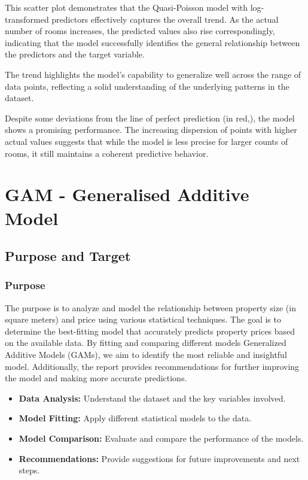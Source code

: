 \documentclass[
]{article}
\begin{document}
This scatter plot demonstrates that the Quasi-Poisson model with
log-transformed predictors effectively captures the overall trend. As
the actual number of rooms increases, the predicted values also rise
correspondingly, indicating that the model successfully identifies the
general relationship between the predictors and the target variable.

The trend highlights the model's capability to generalize well across
the range of data points, reflecting a solid understanding of the
underlying patterns in the dataset.

Despite some deviations from the line of perfect prediction (in red,),
the model shows a promising performance. The increasing dispersion of
points with higher actual values suggests that while the model is less
precise for larger counts of rooms, it still maintains a coherent
predictive behavior.

\section{GAM - Generalised Additive
Model}\label{gam---generalised-additive-model}

\subsection{Purpose and Target}\label{purpose-and-target-3}

\subsubsection{Purpose}\label{purpose}

The purpose is to analyze and model the relationship between property
size (in square meters) and price using various statistical techniques.
The goal is to determine the best-fitting model that accurately predicts
property prices based on the available data. By fitting and comparing
different models Generalized Additive Models (GAMs), we aim to identify
the most reliable and insightful model. Additionally, the report
provides recommendations for further improving the model and making more
accurate predictions.

\begin{itemize}
\item
  \textbf{Data Analysis:} Understand the dataset and the key variables
  involved.
\item
  \textbf{Model Fitting:} Apply different statistical models to the
  data.
\item
  \textbf{Model Comparison:} Evaluate and compare the performance of the
  models.
\item
  \textbf{Recommendations:} Provide suggestions for future improvements
  and next steps.
\end{itemize}
\end{document}
